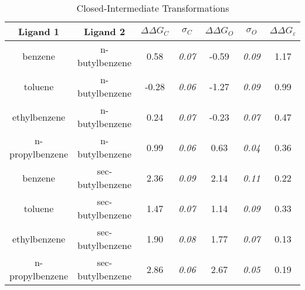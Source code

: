 \documentclass[T4paper.tex]{subfiles}
\begin{document}
\begin{table}[!htb]
\centering
\caption{Closed-Intermediate Transformations}
\label{tbl:C-I}
\begin{tabular}{|c|c|c|c|c|c|c|}
\hline
\textbf{Ligand 1}       & \textbf{Ligand 2}    & {\color[HTML]{800080} \boldmath$\Delta\Delta G_{C}$} & {\color[HTML]{800080} \boldmath$\sigma_{C}$} & {\color[HTML]{008000} \boldmath$\Delta\Delta G_{O}$} & {\color[HTML]{008000} \boldmath$\sigma_{O}$} & \boldmath$\Delta\Delta G_{\varepsilon}$            \\ \hline
benzene         & n-butylbenzene   & 0.58                                   & \textit{0.07}                       & -0.59                                & \textit{0.09}                       & \cellcolor[HTML]{FFCCC9}1.17 \\ \hline
toluene         & n-butylbenzene   & -0.28                                  & \textit{0.06}                       & -1.27                                & \textit{0.09}                       & \cellcolor[HTML]{9AFF99}0.99 \\ \hline
ethylbenzene    & n-butylbenzene   & 0.24                                   & \textit{0.07}                       & -0.23                                & \textit{0.07}                       & \cellcolor[HTML]{9AFF99}0.47 \\ \hline
n-propylbenzene & n-butylbenzene   & 0.99                                   & \textit{0.06}                       & 0.63                                 & \textit{0.04}                       & \cellcolor[HTML]{9AFF99}0.36 \\ \hline
benzene         & sec-butylbenzene & 2.36                                   & \textit{0.09}                       & 2.14                                 & \textit{0.11}                       & \cellcolor[HTML]{9AFF99}0.22 \\ \hline
toluene         & sec-butylbenzene & 1.47                                   & \textit{0.07}                       & 1.14                                 & \textit{0.09}                       & \cellcolor[HTML]{9AFF99}0.33 \\ \hline
ethylbenzene    & sec-butylbenzene & 1.90                                   & \textit{0.08}                       & 1.77                                 & \textit{0.07}                       & \cellcolor[HTML]{9AFF99}0.13 \\ \hline
n-propylbenzene & sec-butylbenzene & 2.86                                   & \textit{0.06}                       & 2.67                                 & \textit{0.05}                       & \cellcolor[HTML]{9AFF99}0.19 \\ \hline
\end{tabular}
\end{table}
\end{document}
